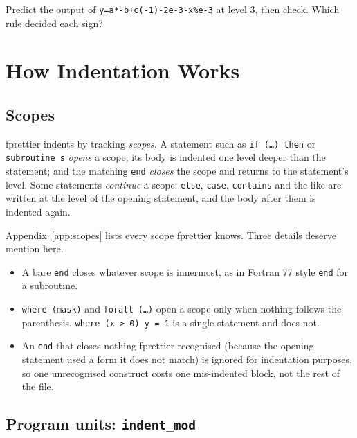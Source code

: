 \documentclass[11pt,a4paper,openany]{book}
\newcommand{\code}[1]{\texttt{\small #1}}
\newcounter{exercise}[chapter]
\begin{document}
\begin{exercise}
Predict the output of
\code{y=a*-b+c(-1)-2e-3-x\%e-3} at level 3, then check. Which rule
decided each sign?
\end{exercise}

\chapter{How Indentation Works}\label{ch:indent-user}

\section{Scopes}

fprettier indents by tracking \emph{scopes}. A statement such as
\code{if (\ldots) then} or \code{subroutine s} \emph{opens} a scope; its body
is indented one level deeper than the statement; and the matching \code{end}
\emph{closes} the scope and returns to the statement's level. Some statements
\emph{continue} a scope: \code{else}, \code{case}, \code{contains} and the
like are written at the level of the opening statement, and the body after
them is indented again.

Appendix~\ref{app:scopes} lists every scope fprettier knows. Three details
deserve mention here.

\begin{itemize}
  \item A bare \code{end} closes whatever scope is innermost, as in Fortran 77
    style \code{end} for a subroutine.
  \item \code{where (mask)} and \code{forall (\ldots)} open a scope only when
    nothing follows the parenthesis. \code{where (x > 0) y = 1} is a single
    statement and does not.
  \item An \code{end} that closes nothing fprettier recognised (because the
    opening statement used a form it does not match) is ignored for indentation
    purposes, so one unrecognised construct costs one mis-indented block, not
    the rest of the file.
\end{itemize}

\section{Program units: \texttt{indent\_mod}}
\end{document}
